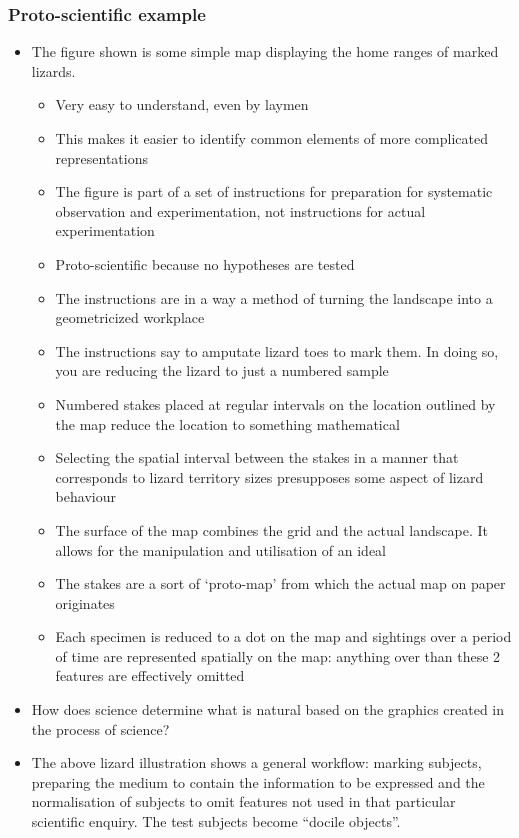 \documentclass[a4paper]{article}
\begin{document}
\subsubsection{Proto-scientific example}
\begin{itemize}
	\item The figure shown is some simple map displaying the home ranges of marked lizards.
	\begin{itemize}[label=$\circ$]
		\item Very easy to understand, even by laymen
		\item This makes it easier to identify common elements of more complicated representations
		\item The figure is part of a set of instructions for preparation for systematic observation and experimentation, not instructions for actual experimentation
		\item Proto-scientific because no hypotheses are tested
		\item The instructions are in a way a method of turning the landscape into a geometricized workplace
		\item The instructions say to amputate lizard toes to mark them. In doing so, you are reducing the lizard to just a numbered sample
		\item Numbered stakes placed at regular intervals on the location outlined by the map reduce the location to something mathematical
		\item Selecting the spatial interval between the stakes in a manner that corresponds to lizard territory sizes presupposes some aspect of lizard behaviour
		\item The surface of the map combines the grid and the actual landscape. It allows for the manipulation and utilisation of an ideal
		\item The stakes are a sort of `proto-map' from which the actual map on paper originates
		\item Each specimen is reduced to a dot on the map and sightings over a period of time are represented spatially on the map: anything over than these 2 features are effectively omitted
	\end{itemize}
	\item How does science determine what is natural based on the graphics created in the process of science?
	\item The above lizard illustration shows a general workflow: marking subjects, preparing the medium to contain the information to be expressed and the normalisation of subjects to omit features not used in that particular scientific enquiry. The test subjects become “docile objects”.
\end{itemize}
\end{document}
